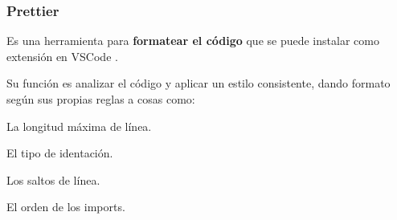\documentclass[12pt,twoside,titlepage]{report}
\begin{document}
\subsubsection{Prettier}

Es una herramienta para \textbf{formatear el código} que se puede instalar como extensión en VSCode \cite{prettier}. 

Su función es analizar el código y aplicar un estilo consistente, dando formato según sus propias reglas a cosas como: 

\begin{compactitem}
    \item La longitud máxima de línea.
    \item El tipo de identación.
    \item Los saltos de línea.
    \item El orden de los imports.
   \end{compactitem}

\end{document}
